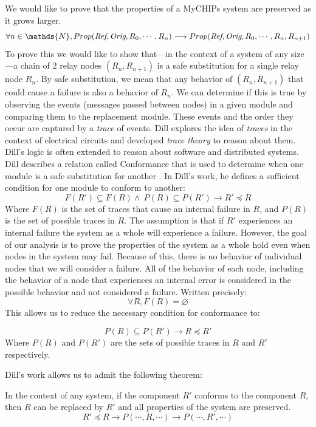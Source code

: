 \documentclass[runningheads]{llncs}
\newif\ifcomments
\newcommand{\krs}[1]{\ifcomments\textcolor{blue}{krs: #1}\fi}
\begin{document}
We would like to prove that the properties of a MyCHIPs system are preserved as it grows larger. 
$$
\forall n \in \mathds{N}, Prop(\emph{Ref}, \emph{Orig}, R_0, \dotsm, R_n) \longrightarrow Prop(\emph{Ref}, \emph{Orig}, R_0, \dotsm, R_n, R_{n+1})
$$
To prove this we would like to show that---in the context of a system of any size---a chain of 2 relay nodes $(R_n, R_{n+1})$ is a safe substitution for a single relay node $R_n$. By safe substitution, we mean that any behavior of $(R_n, R_{n+1})$ that could cause a failure is also a behavior of $R_n$. We can determine if this is true by observing the events (messages passed between nodes) in a given module and comparing them to the replacement module. These events and the order they occur are captured by a \emph{trace} of events. Dill explores the idea of \emph{traces} in the context of electrical circuits and developed \emph{trace theory} to reason about them. Dill's logic is often extended to reason about software and distributed systems. \krs{egm, is this true? I did a brief search and did not find many others using this... I can just remove this...} Dill describes a relation called Conformance that is used to determine when one module is a safe substitution for another \cite{dill_trace_theory}.
In Dill's work, he defines a sufficient condition for one module to conform to another:
$$F(R') \subseteq F(R) \wedge\ P(R) \subseteq P(R') \longrightarrow R' \preceq R$$
Where $F(R)$ is the set of traces that cause an internal failure in $R$, and $P(R)$ is the set of possible traces in $R$. 
The assumption is that if $R'$ experiences an internal failure the system as a whole will experience a failure. However, the goal of our analysis is to prove the properties of the system as a whole hold even when nodes in the system may fail. Because of this, there is no behavior of individual nodes that we will consider a failure. All of the behavior of each node, including the behavior of a node that experiences an internal error is considered in the possible behavior and not considered a failure. Written precisely:
$$
\forall R, F(R) = \varnothing
$$
This allows us to reduce the necessary condition for conformance to:

\begin{definition}[Conformance]
\label{def:conformance}
$$P(R) \subseteq P(R') \longrightarrow R \preceq R'$$
Where $P(R)$ and $P(R')$ are the sets of possible traces in $R$ and $R'$ respectively. 
\end{definition}

Dill's work allows us to admit the following theorem: 
\begin{theorem}
\label{theorem:dill}
 In the context of any system, if the component $R'$ conforms to the component $R$, then $R$ can be replaced by $R'$ and all properties of the system are preserved.
$$R' \preceq R \longrightarrow P(\dotsm, R, \dotsm) \longrightarrow P(\dotsm, R', \dotsm)
$$
\end{theorem}
\end{document}
